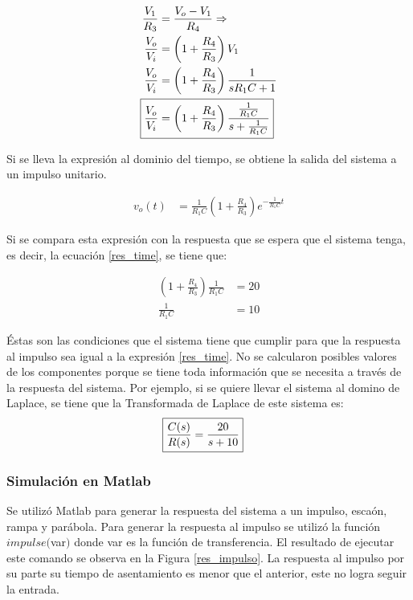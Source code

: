 \documentclass[journal]{IEEEtran}
\begin{document}
\begin{align*}
	\frac{V_1}{R_3} & = \frac{V_o -V_1}{R_4} \Rightarrow \\ 
	\frac{V_o}{V_i} & = \left( 1 + \frac{R_4}{R_3} \right)
	 V_{1} \\
	\frac{V_o}{V_i} & = \left
	( 1 + \frac{R_4}{R_3} \right)\frac{1}{ s R_1 C + 1} \\
	\Aboxed {\frac{V_o}{V_i} & = \left
	( 1 + \frac{R_4}{R_3} \right)
	\frac{\frac{1}{R_1 C}}{ s  + \frac{1}{R_1 C}}}
\end{align*}

Si se lleva la expresi\'on al dominio del tiempo, se obtiene
la salida del sistema a un impulso unitario.
  
\begin{align*}
	v_o(t) & = \frac{1}{R_1 C} 
	\left ( 1 + \frac{R_4}{R_3} \right) 
	 e^{- \frac{1}{R_1 C} t}  	
\end{align*}

Si se compara esta expresi\'on con la respuesta que se 
espera que el sistema tenga, es decir, la ecuación \ref{res_time}, se tiene que: 

\begin{align}
	\label{equAmpl} \left( 1 + \frac{R_4}{R_3} \right)
	\frac{1}{R_1 C} & = 20 \\ 
	\label{equTao} 	\frac{1}{R_1 C} &=  10 
\end{align}

\'Estas son las condiciones que el sistema tiene que cumplir 
para que la respuesta al impulso sea igual a la expresi\'on 
\ref{res_time}. No se calcularon posibles valores de los 
componentes porque se tiene toda informaci\'on que se 
necesita a trav\'es de la respuesta del sistema. 
Por ejemplo, si se
quiere llevar el sistema al domino de Laplace, se tiene 
que la Transformada de Laplace de este sistema es: 
\begin{align}
	\label{tf_primerOrden} \Aboxed {\frac{C(s)}{R(s)} 
	& = \frac{20}{s + 10}}
\end{align}

\subsubsection*{Simulaci\'on en Matlab} Se utiliz\'o Matlab 
para generar la respuesta del sistema a un impulso, esca\'on,
rampa y par\'abola. Para generar la respuesta al impulso se 
utiliz\'o la funci\'on $impulse($var$)$ donde var es la 
funci\'on de transferencia. El resultado de ejecutar este 
comando se observa en la Figura \ref{res_impulso}. 
La respuesta al impulso por su parte su tiempo de
asentamiento es menor que el
anterior, este no logra seguir la entrada.\\
\end{document}
